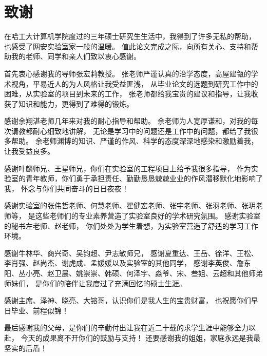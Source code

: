 \chapter*{致\quad 谢}
{}

在哈工大计算机学院度过的三年硕士研究生生活中，我得到了许多无私的帮助，
也感受了网安实验室家一般的温暖。
值此论文完成之际，向所有关心、支持和帮助我的老师、同学和亲人们致以衷心感谢。

首先衷心感谢我的导师张宏莉教授。
张老师严谨认真的治学态度，高屋建瓴的学术视角，平易近人的为人风格让我受益匪浅，
从毕业论文的选题到研究工作中的困难，从实验室的项目到未来的工作，
张老师都给我宝贵的建议和指导，让我收获了知识和能力，更得到了难得的锻炼。

感谢余翔湛老师几年来对我的耐心指导和帮助。
余老师为人宽厚谦和，对我的每次请教都耐心细致地讲解，
无论是学习中的问题还是工作中的问题，都给了我很多帮助。
余老师渊博的知识、严谨的作风、科学的态度深深地感染和激励着我，让我受益良多。

感谢叶麟师兄、王星师兄，你们在实验室的工程项目上给予我很多指导，
作为实验室的青年教师，你们勇于承担责任、勤勤恳恳兢兢业业的作风潜移默化地影响了我，
怀念与你们共同奋斗的日日夜夜！

感谢实验室的张伟哲老师、何慧老师、翟健宏老师、张宇老师、张羽老师、张玥老师等，
是这些老师们的专业素养营造了实验室良好的学术研究氛围。
感谢实验室的秘书左老师、赵老师，
你们处处为学生着想，为实验室营造了舒适的学习工作环境。

感谢牛林华、商兴奇、吴钧超、尹志敏师兄，
感谢夏重达、王岳、徐洋、王松、李肖强、赵尚杰、谢虎成、孟媛媛以及实验室的其他同学，
感谢李英俊、詹东阳、丛小亮、赵卫晨、姚崇崇、韩硕、何泽宇、淼爷、宋、叁姐、云超和其他师弟师妹们，
是你们的陪伴让我度过了充满回忆的硕士生涯。

感谢主席、泽神、晓亮、大镕哥，认识你们是我人生的宝贵财富，
也祝愿你们早日毕业、前程似锦！

最后感谢我的父母，是你们的辛勤付出让我在近二十载的求学生涯中能够全力以赴，
今天的成果离不开你们的鼓励与支持！
还要感谢我的姐姐，家庭永远是我最坚实的后盾！
